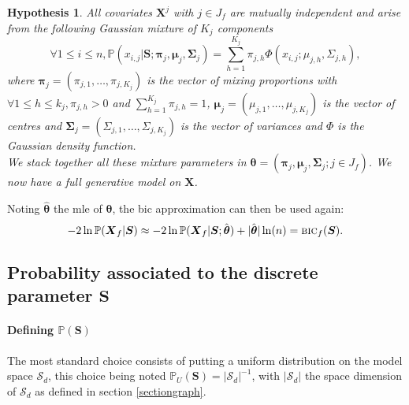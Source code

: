 \documentclass[12pt,a4paper]{report}
\newtheorem{hyp}{Hypothesis}
\begin{document}
\begin{hyp}\label{H4}
All covariates $\boldsymbol{X}^j$ with $j \in J_f$ are mutually independent and arise from the following Gaussian mixture of $K_j$ components
\begin{equation}
\forall 1\leq i \leq n, \mathbb{P}(x_{i,j}|\boldsymbol{S};\boldsymbol{\pi}_{j},\boldsymbol{\mu}_j,\boldsymbol{\Sigma}_j) = \sum_{h=1}^{K_j} \pi_{j,h} \Phi(x_{i,j};\mu_{j,h} ,\Sigma_{j,h}), \nonumber
\end{equation}
where $\boldsymbol{\pi}_{j}=(\pi_{j,1},\ldots,\pi_{j,K_j})$ is the vector of mixing proportions with $\forall 1\leq h\leq k_j , \pi_{j,h}>0$ and $\sum_{h=1}^{K_j}\pi_{j,h}=1$, $\boldsymbol{\mu}_j=(\mu_{j,1},\ldots,\mu_{j,K_j})$  is the vector of centres and $\boldsymbol{\Sigma}_j=(\Sigma_{j,1},\ldots,\Sigma_{j,K_j})$ is the vector of variances and $\Phi$ is the Gaussian density function. \\We stack together all these mixture parameters in $\boldsymbol{\theta}=(\boldsymbol{\pi}_{j},\boldsymbol{\mu}_j,\boldsymbol{\Sigma}_j ; j \in J_f)$. We now have a full generative model on $\boldsymbol{X}$.
\end{hyp}
		 

\vspace{3mm}

Noting $\hat{\boldsymbol{\theta}}$ the {\sc mle} of $\boldsymbol{\theta}$, the {\sc bic} approximation can then be used again:
\begin{equation}
-2\ln \mathbb{P}(\boldsymbol{X}_f|\boldsymbol{S}) \approx -2\ln \mathbb{P}(\boldsymbol{X}_f|\boldsymbol{S};\hat{\boldsymbol{\theta}}) + |\hat{\boldsymbol{\theta}}| \ln(n) = \mbox{{\sc bic}}_f(\boldsymbol{S}). \nonumber
\end{equation}
\subsection{Probability associated to the discrete parameter $\boldsymbol{S}$}
\paragraph{Defining $\mathbb{P}(\boldsymbol{S})$} The most standard choice consists of putting a uniform distribution on the model space $\mathcal{S}_d$, this choice being noted $\mathbb{P}_U(\boldsymbol{S}) = |\mathcal{S}_d|^{-1}$, with $|\mathcal{S}_d|$ the space dimension of $\mathcal{S}_d$ as defined in section \ref{sectiongraph}.
		
	
\end{document}
